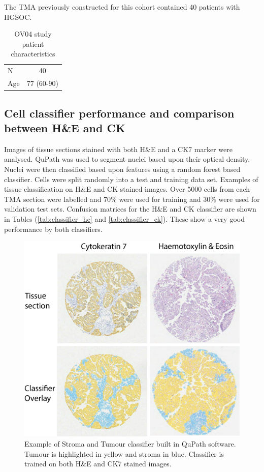 The TMA previously constructed for this cohort contained 40 patients with HGSOC. 

\begin{table}[]
    \centering
    \begin{tabular}{lc}
    \hline
       N  &  40 \\
        Age &  77 (60-90)
    \hline
    \end{tabular}
    \caption{OV04 study patient characteristics}
    \label{tab:OV04_patient}
\end{table}




\subsection{Cell classifier performance and comparison between H\&E and CK}

Images of tissue sections stained with both H\&E and a CK7 marker were analysed. QuPath was used to segment nuclei based upon their optical density. Nuclei were then classified based upon features using a random forest based classifier. Cells were split randomly into a test and training data set. Examples of tissue classification on H\&E and CK stained images. Over 5000 cells from each TMA section were labelled and 70\% were used for training and 30\% were used for validation test sets. Confusion matrices for the H\&E and CK classifier are shown in Tables (\ref{tab:classifier_he} and \ref{tab:classifier_ck}). These show a very good performance by both classifiers. 


\begin{figure}
    \centering
    \includegraphics{Figs/heck/A-2_core_class.png}
    \caption[Example of Stroma and Tumour classifier built in QuPath software]{Example of Stroma and Tumour classifier built in QuPath software. Tumour is highlighted in yellow and stroma in blue. Classifier is trained on both H\&E and CK7 stained images.}
    \label{fig:he_classify}
\end{figure}

